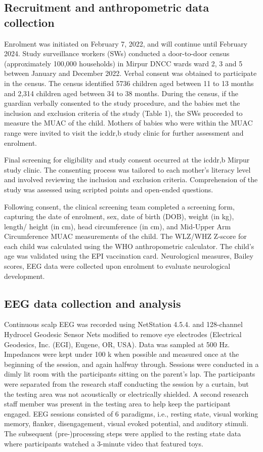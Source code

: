\documentclass{article}
\begin{document}
\subsection*{Recruitment and anthropometric data collection}
Enrolment was initiated on February 7, 2022, and will continue until February 2024.
Study surveillance workers (SWs) conducted a door-to-door census (approximately 100,000 households) in Mirpur DNCC wards ward 2, 3 and 5 between January and December 2022.
Verbal consent was obtained to participate in the census.
The census identified 5736 children aged between 11 to 13 months and 2,314 children aged between 34 to 38 months.
During the census, if the guardian verbally consented to the study procedure, and the babies met the inclusion and exclusion criteria of the study (Table 1), the SWs proceeded to measure the \gls{MUAC} of the child.
Mothers of babies who were within the \gls{MUAC} range were invited to visit the icddr,b study clinic for further assessment and enrolment.

Final screening for eligibility and study consent occurred at the icddr,b Mirpur study clinic.
The consenting process was tailored to each mother's literacy level and involved reviewing the inclusion and exclusion criteria.
Comprehension of the study was assessed using scripted points and open-ended questions.

Following consent, the clinical screening team completed a screening form, capturing the date of enrolment, sex, date of birth (DOB), weight (in kg), length/ height (in cm), head circumference (in cm), and Mid-Upper Arm Circumference \gls{MUAC} measurements of the child.
The \gls{WLZ/WHZ} Z-score for each child was calculated using the WHO anthropometric calculator.
The child's age was validated using the EPI vaccination card.
Neurological measures, Bailey scores, EEG data were collected upon enrolment to evaluate neurological development.

\subsection*{EEG data collection and analysis}
Continuous scalp EEG was recorded using NetStation 4.5.4. and 128-channel Hydrocel Geodesic Sensor Nets modified to remove eye electrodes (Electrical Geodesics, Inc. (EGI), Eugene, OR, USA).
Data was sampled at 500 Hz.
Impedances were kept under 100 k \textomega{} when possible and measured once at the beginning of the session, and again halfway through.
Sessions were conducted in a dimly lit room with the participants sitting on the parent’s lap.
The participants were separated from the research staff conducting the session by a curtain, but the testing area was not acoustically or electrically shielded.
A second research staff member was present in the testing area to help keep the participant engaged.
EEG sessions consisted of 6 paradigms, i.e., resting state, visual working memory, flanker, disengagement, visual evoked potential, and auditory stimuli.
The subsequent (pre-)processing steps were applied to the resting state data where participants watched a 3-minute video that featured toys.
\end{document}
